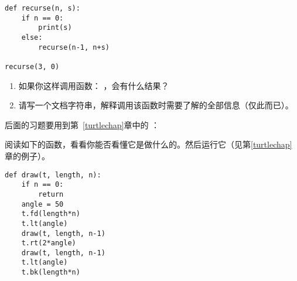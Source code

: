 {{{{\begin{exercise}
\begin{em}
\begin{lstlisting}
def recurse(n, s):
    if n == 0:
        print(s)
    else:
        recurse(n-1, n+s)

recurse(3, 0)
\end{lstlisting}
\end{em}

\begin{enumerate}



\end{enumerate}

\begin{enumerate}

\item 如果你这样调用函数： {\em {}} ，会有什么结果？

\item 请写一个文档字符串，解释调用该函数时需要了解的全部信息（仅此而已）。

\end{enumerate}

\end{exercise}


后面的习题要用到第~\ref{turtlechap}章中的 ：

\begin{exercise}


阅读如下的函数，看看你能否看懂它是做什么的。然后运行它（见第\ref{turtlechap}章的例子）。

\begin{em}
\begin{lstlisting}
def draw(t, length, n):
    if n == 0:
        return
    angle = 50
    t.fd(length*n)
    t.lt(angle)
    draw(t, length, n-1)
    t.rt(2*angle)
    draw(t, length, n-1)
    t.lt(angle)
    t.bk(length*n)
\end{lstlisting}
\end{em}


\end{exercise}}}}}
